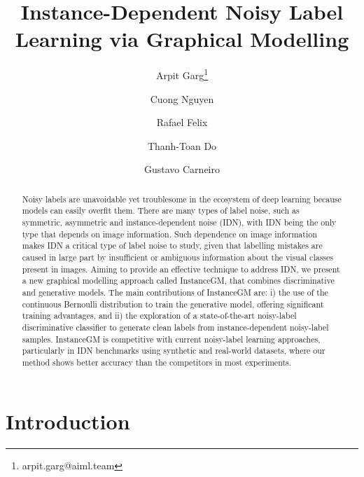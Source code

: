\documentclass[10pt,twocolumn,letterpaper]{article}
\begin{document}
\title{Instance-Dependent Noisy Label Learning via Graphical Modelling}
    
\author[1]{Arpit Garg\thanks{arpit.garg@aiml.team}}
    \author[1]{Cuong Nguyen}
    \author[1]{Rafael Felix}
    \author[2]{Thanh-Toan Do}
    \author[1]{Gustavo Carneiro}
    
    \renewcommand\Affilfont{\normalsize}
    
    \maketitle
    \thispagestyle{empty}
    
\begin{abstract}
    Noisy labels are unavoidable yet troublesome in the ecosystem of deep learning because models can easily overfit them. There are many types of label noise, such as symmetric, asymmetric and instance-dependent noise (IDN), with IDN being the only type that depends on image information. Such dependence on image information makes IDN a critical type of label noise to study, given that labelling mistakes are caused in large part by insufficient or ambiguous information about the visual classes present in images. Aiming to provide an effective technique to address IDN, we present a new graphical modelling approach called InstanceGM, that combines  discriminative and generative models. The main contributions of InstanceGM are: i) the use of the continuous Bernoulli distribution to train the generative model, offering significant training advantages, and ii) the exploration of a state-of-the-art noisy-label discriminative classifier to generate clean labels from instance-dependent noisy-label samples. InstanceGM is competitive with current noisy-label learning approaches, particularly in IDN benchmarks using synthetic and real-world datasets, where our method shows better accuracy than the competitors in most experiments.
\end{abstract}
     
\section{Introduction}
\end{document}
